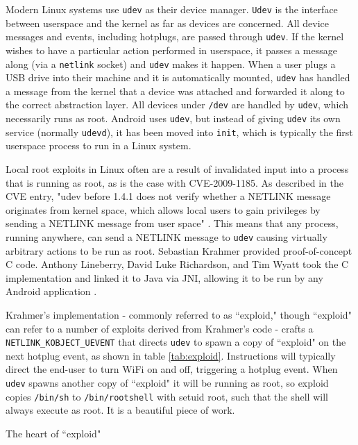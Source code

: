 Modern Linux systems use \texttt{udev} as their device manager.  \texttt{Udev} is the interface between userspace and the kernel as
far as devices are concerned.  All device messages and events, including hotplugs, are passed through \texttt{udev}.  If the kernel
wishes to have a particular action performed in userspace, it passes a message along (via a \texttt{netlink} socket) and
\texttt{udev} makes it happen.  When a user plugs a USB drive into their machine and it is automatically mounted, \texttt{udev} has
handled a message from the kernel that a device was attached and forwarded it along to the correct abstraction layer.  All devices
under \texttt{/dev} are handled by \texttt{udev}, which necessarily runs as root.  Android uses \texttt{udev}, but instead
of giving \texttt{udev} its own service (normally \texttt{udevd}), it has been moved into \texttt{init}, which is typically the
first userspace process to run in a Linux system.

Local root exploits in Linux often are a result of invalidated input into a process that is running as root, as is the case with
CVE-2009-1185.  As described in the CVE entry, "udev before 1.4.1 does not verify whether a NETLINK message originates from kernel
space, which allows local users to gain privileges by sending a NETLINK message from user space" \cite{udevcve}.  This means that
any process, running anywhere, can send a NETLINK message to \texttt{udev} causing virtually arbitrary actions to be run as root.
Sebastian Krahmer provided proof-of-concept C code.  Anthony Lineberry, David Luke Richardson, and Tim Wyatt took the C
implementation and linked it to Java via JNI, allowing it to be run by any Android application \cite{arentpermissions}.

Krahmer's implementation - commonly referred to as ``exploid," though ``exploid" can refer to a number of exploits derived from
Krahmer's code - crafts a \texttt{NETLINK\_KOBJECT\_UEVENT} that directs \texttt{udev} to spawn a copy of ``exploid" on the next
hotplug event, as shown in table \ref{tab:exploid}.  Instructions will typically direct the end-user to turn WiFi on and off,
triggering a hotplug event.  When \texttt{udev} spawns another copy of ``exploid" it will be running as root, so exploid copies
\texttt{/bin/sh} to \texttt{/bin/rootshell} with setuid root, such that the shell will always execute as root.  It is a beautiful
piece of work.

\begin{table}

\caption{The heart of ``exploid"}
\label{tab:exploid}
\end{table}

